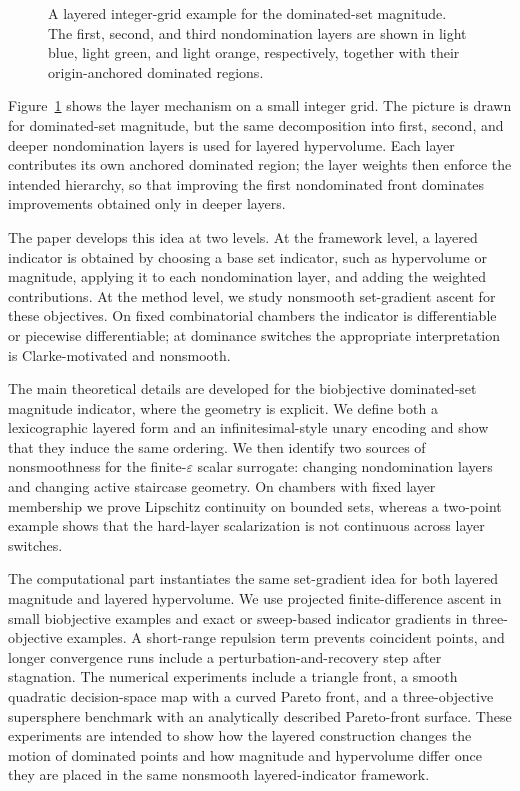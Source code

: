 \documentclass{article}
\begin{document}
\begin{figure}[t]
\caption{A layered integer-grid example for the dominated-set magnitude. The first, second, and third nondomination layers are shown in light blue, light green, and light orange, respectively, together with their origin-anchored dominated regions.}
\label{fig:intro-layered-example}
\end{figure}

Figure~\ref{fig:intro-layered-example} shows the layer mechanism on a small integer grid.  The picture is drawn for dominated-set magnitude, but the same decomposition into first, second, and deeper nondomination layers is used for layered hypervolume.  Each layer contributes its own anchored dominated region; the layer weights then enforce the intended hierarchy, so that improving the first nondominated front dominates improvements obtained only in deeper layers.

The paper develops this idea at two levels.  At the framework level, a layered indicator is obtained by choosing a base set indicator, such as hypervolume or magnitude, applying it to each nondomination layer, and adding the weighted contributions.  At the method level, we study nonsmooth set-gradient ascent for these objectives.  On fixed combinatorial chambers the indicator is differentiable or piecewise differentiable; at dominance switches the appropriate interpretation is Clarke-motivated and nonsmooth.

The main theoretical details are developed for the biobjective dominated-set magnitude indicator, where the geometry is explicit.  We define both a lexicographic layered form and an infinitesimal-style unary encoding and show that they induce the same ordering.  We then identify two sources of nonsmoothness for the finite-$\varepsilon$ scalar surrogate: changing nondomination layers and changing active staircase geometry.  On chambers with fixed layer membership we prove Lipschitz continuity on bounded sets, whereas a two-point example shows that the hard-layer scalarization is not continuous across layer switches.

The computational part instantiates the same set-gradient idea for both layered magnitude and layered hypervolume.  We use projected finite-difference ascent in small biobjective examples and exact or sweep-based indicator gradients in three-objective examples.  A short-range repulsion term prevents coincident points, and longer convergence runs include a perturbation-and-recovery step after stagnation.  The numerical experiments include a triangle front, a smooth quadratic decision-space map with a curved Pareto front, and a three-objective supersphere benchmark with an analytically described Pareto-front surface.  These experiments are intended to show how the layered construction changes the motion of dominated points and how magnitude and hypervolume differ once they are placed in the same nonsmooth layered-indicator framework.
\end{document}
